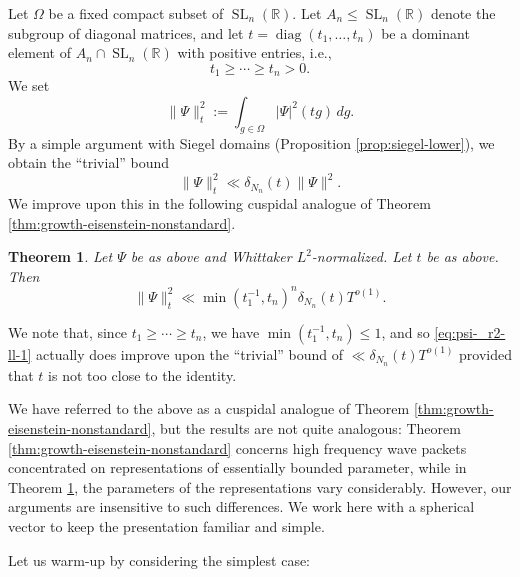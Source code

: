 \documentclass[reqno]{amsart}
\DeclareMathOperator{\SL}{SL}
\DeclareMathOperator{\diag}{diag}
\theoremstyle{plain} \newtheorem{theorem} {Theorem}
\theoremstyle{definition} \newtheorem{definition} [theorem] {Definition}
\theoremstyle{itplain} %
\numberwithin{equation}{section}
\numberwithin{theorem}{section}
\renewcommand{\geq}{\geqslant}
\renewcommand{\leq}{\leqslant}
\begin{document}
Let $\Omega$ be a fixed compact subset of $\SL_n(\mathbb{R})$.  Let $A_n \leq \SL_n(\mathbb{R})$ denote the subgroup of diagonal matrices, and let $t = \diag(t_1,\dotsc,t_n)$ be a dominant element of $A_n \cap \SL_n(\mathbb{R})$ with positive entries, i.e.,
\begin{equation*}
t_1 \geq \dotsb \geq t_n > 0.
\end{equation*}
We set
\begin{equation*}
  \|\Psi \|_t^2 := \int _{g \in \Omega } |\Psi|^2(t g) \, d g.
\end{equation*}
By a simple argument with Siegel domains (Proposition \ref{prop:siegel-lower}), we obtain  the ``trivial'' bound
\begin{equation}\label{eq:psi-_r2-ll-2}
  \|\Psi \|_t^2 \ll \delta_{N_n}(t) \|\Psi \|^2.
\end{equation}
We improve upon this in the following cuspidal analogue of Theorem \ref{thm:growth-eisenstein-nonstandard}.
\begin{theorem}\label{thm:sub-gln:let-psi-be}
  Let $\Psi$ be as above and Whittaker $L^2$-normalized.  Let $t$ be as above.  Then
  \begin{equation}\label{eq:psi-_r2-ll-1}
    \|\Psi \|_t^2 \ll \min(t_1^{-1}, t_n)^n \delta_{N_n}(t) T^{o(1)}.
  \end{equation}
\end{theorem}
\begin{remark}
  We note that, since $t_1 \geq \dotsb \geq t_n$, we have $\min(t_1^{-1}, t_n) \leq 1$, and so \eqref{eq:psi-_r2-ll-1} actually does improve upon the ``trivial'' bound of $\ll \delta_{N_n}(t) T^{o(1)}$ provided that $t$ is not too close to the identity.
\end{remark}
\begin{remark}
  We have referred to the above as a cuspidal analogue of Theorem \ref{thm:growth-eisenstein-nonstandard}, but the results are not quite analogous: Theorem \ref{thm:growth-eisenstein-nonstandard} concerns high frequency wave packets concentrated on representations of essentially bounded parameter, while in Theorem \ref{thm:sub-gln:let-psi-be}, the parameters of the representations vary considerably.  However, our arguments are insensitive to such differences.  We work here with a spherical vector to keep the presentation familiar and simple.
\end{remark}
Let us warm-up by considering the simplest case:
\end{document}
